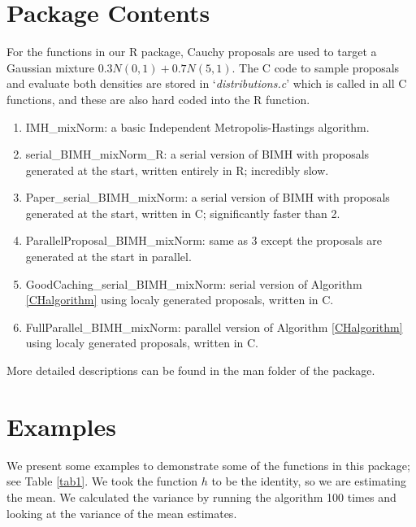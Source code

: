 \documentclass[11pt,a4paper]{article}
\begin{document}
\section{Package Contents}
For the functions in our R package, Cauchy proposals are used to target a Gaussian mixture $0.3N(0,1)+0.7N(5,1)$. The C code to sample proposals and evaluate both densities are stored in `\textit{distributions.c}' which is called in all C functions, and these are also hard coded into the R function. 

\begin{enumerate}
\item{IMH\_mixNorm: a basic Independent Metropolis-Hastings algorithm.}
\item{serial\_BIMH\_mixNorm\_R: a serial version of BIMH with proposals generated at the start, written entirely in R; incredibly slow.}
\item{Paper\_serial\_BIMH\_mixNorm: a serial version of BIMH with proposals generated at the start, written in C; significantly faster than 2.}
\item{ParallelProposal\_BIMH\_mixNorm: same as 3 except the proposals are generated at the start in parallel.}
\item{GoodCaching\_serial\_BIMH\_mixNorm: serial version of Algorithm \ref{CHalgorithm} using localy generated proposals, written in C.}
\item{FullParallel\_BIMH\_mixNorm: parallel version of Algorithm \ref{CHalgorithm}  using localy generated proposals, written in C.}
\end{enumerate}

More detailed descriptions can be found in the man folder of the package.

\section{Examples}

We present some examples to demonstrate some of the functions in this package; see Table \ref{tab1}. We took the function $h$ to be the identity, so we are estimating the mean. We calculated the variance by running the algorithm 100 times and looking at the variance of the mean estimates.
\end{document}
